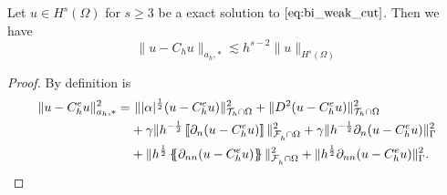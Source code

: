 \begin{lemma}
    \label{lemma:astar_estimate}
    Let $u \in H^{s}( \Omega ) $ for $s\ge 3$ be a exact solution to $\eqref{eq:bi_weak_cut} $. Then we have  \[
    \|  u - C_{h}u \|_{ a_{h},*  }^{  } \lesssim h^{s-2} \| u \|_{ H^{s}( \Omega )  }^{  }
    \]

\end{lemma}
\begin{proof}
    By definition is
    \[
        \begin{split}
            \| u - C_{h}^{e}u \|_{ a_{h}, * }^{  2}  =& \ \| |\alpha |^{\frac{1}{2}} ( u - C_{h}^{e}u) \|_{ \mathcal{T} _{h} \cap \Omega  }^{ 2}  + \| D^2 ( u - C_{h}^{e}u ) \|_{\mathcal{T} _{h} \cap \Omega   }^{ 2 } \\  &  + \gamma \| h^{-\frac{1}{2}} \left[\!\left[  \partial _{n} (u -
        C_{h}^{e} u)  \right]\!\right]   \|_{ \mathcal{F}_{h}^{}\cap \Omega    }^{ 2
        } + \gamma \| h^{-\frac{1}{2}}  \partial _{n} (u - C_{h}^{e}u)    \|_{ \Gamma   }^{ 2 } \\
          & + \| h^{\frac{1}{2}} \left\{\!\!\left\{ \partial _{nn} (u - C_{h}^{e}u) \right\}\!\!\right\}   \|_{\mathcal{F} _{h}^{} \cap \Omega   }^{  2} +  \| h^{\frac{1}{2}} \partial _{nn}(u - C_{h}^{e}u)     \|_{ \Gamma }^{  2}.
        \end{split}
    \]


\end{proof}

